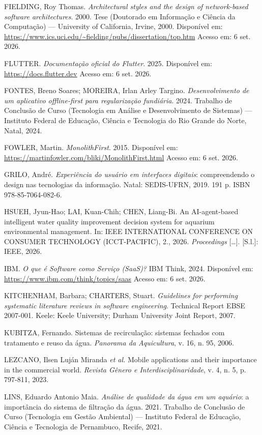 \documentclass[12pt,oneside,a4paper,brazilian]{abntex2}
\begin{document}
FIELDING, Roy Thomas. \textit{Architectural styles and the design of network-based software architectures}. 2000. Tese (Doutorado em Informação e Ciência da Computação) --- University of California, Irvine, 2000. Disponível em: \url{https://www.ics.uci.edu/~fielding/pubs/dissertation/top.htm} Acesso em: 6 set. 2026.

FLUTTER. \textit{Documentação oficial do Flutter}. 2025. Disponível em: \url{https://docs.flutter.dev} Acesso em: 6 set. 2026.

FONTES, Breno Soares; MOREIRA, Irlan Arley Targino. \textit{Desenvolvimento de um aplicativo offline-first para regularização fundiária}. 2024. Trabalho de Conclusão de Curso (Tecnologia em Análise e Desenvolvimento de Sistemas) --- Instituto Federal de Educação, Ciência e Tecnologia do Rio Grande do Norte, Natal, 2024.

FOWLER, Martin. \textit{MonolithFirst}. 2015. Disponível em: \url{https://martinfowler.com/bliki/MonolithFirst.html} Acesso em: 6 set. 2026.

GRILO, André. \textit{Experiência do usuário em interfaces digitais}: compreendendo o design nas tecnologias da informação. Natal: SEDIS-UFRN, 2019. 191 p. ISBN 978-85-7064-082-6.

HSUEH, Jyun-Hao; LAI, Kuan-Chih; CHEN, Liang-Bi. An AI-agent-based intelligent water quality improvement decision system for aquarium environmental management. In: IEEE INTERNATIONAL CONFERENCE ON CONSUMER TECHNOLOGY (ICCT-PACIFIC), 2., 2026. \textit{Proceedings} [\ldots{}]. [S.l.]: IEEE, 2026.

IBM. \textit{O que é Software como Serviço (SaaS)?} IBM Think, 2024. Disponível em: \url{https://www.ibm.com/think/topics/saas} Acesso em: 6 set. 2026.

KITCHENHAM, Barbara; CHARTERS, Stuart. \textit{Guidelines for performing systematic literature reviews in software engineering}. Technical Report EBSE 2007-001. Keele: Keele University; Durham University Joint Report, 2007.

KUBITZA, Fernando. Sistemas de recirculação: sistemas fechados com tratamento e reuso da água. \textit{Panorama da Aquicultura}, v. 16, n. 95, 2006.

LEZCANO, Ilsen Luján Miranda \textit{et al.} Mobile applications and their importance in the commercial world. \textit{Revista Gênero e Interdisciplinaridade}, v. 4, n. 5, p. 797-811, 2023.

LINS, Eduardo Antonio Maia. \textit{Análise de qualidade da água em um aquário}: a importância do sistema de filtração da água. 2021. Trabalho de Conclusão de Curso (Tecnologia em Gestão Ambiental) --- Instituto Federal de Educação, Ciência e Tecnologia de Pernambuco, Recife, 2021.
\end{document}
